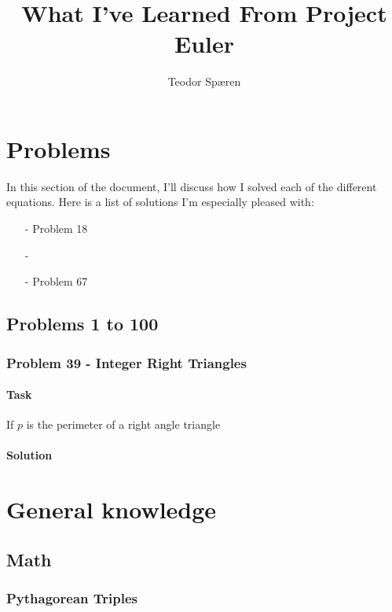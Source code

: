 \documentclass[a4paper]{report}
\begin{document}
\title{What I've Learned From Project Euler}
\author{Teodor Spæren}

\maketitle

\tableofcontents

\part{Problems}
In this section of the document, I'll discuss how I solved each of the different equations. Here is a list of solutions
I'm especially pleased with:

\begin{itemize}
    \item[-] Problem 18
    \item[-] 
    \item[-] Problem 67
\end{itemize}

\chapter{Problems 1 to 100}
\section{Problem 39 - Integer Right Triangles}
\label{sec:problem39}

\subsection{Task}


If $p$ is the perimeter of a right angle triangle 

\subsection{Solution}


\part{General knowledge}

\chapter{Math}
\section{Pythagorean Triples}
\end{document}
